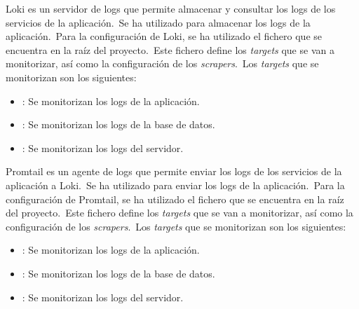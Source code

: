 Loki es un servidor de logs que permite almacenar y consultar los logs de los servicios de la aplicación.\ Se ha
utilizado para almacenar los logs de la aplicación.\ Para la configuración de Loki, se ha utilizado el fichero
 que se encuentra en la raíz del proyecto.\ Este fichero define los \textit{targets} que se van a
monitorizar, así como la configuración de los \textit{scrapers}.\ Los \textit{targets} que se monitorizan son los
siguientes:

\begin{itemize}
	\item {}: Se monitorizan los logs de la aplicación.
	\item {}: Se monitorizan los logs de la base de datos.
	\item {}: Se monitorizan los logs del servidor.
\end{itemize}

Promtail es un agente de logs que permite enviar los logs de los servicios de la aplicación a Loki.\ Se ha utilizado
para enviar los logs de la aplicación.\ Para la configuración de Promtail, se ha utilizado el fichero
 que se encuentra en la raíz del proyecto.\ Este fichero define los \textit{targets} que se van
a monitorizar, así como la configuración de los \textit{scrapers}.\ Los \textit{targets} que se monitorizan son los
siguientes:

\begin{itemize}
	\item {}: Se monitorizan los logs de la aplicación.
	\item {}: Se monitorizan los logs de la base de datos.
	\item {}: Se monitorizan los logs del servidor.
\end{itemize}

